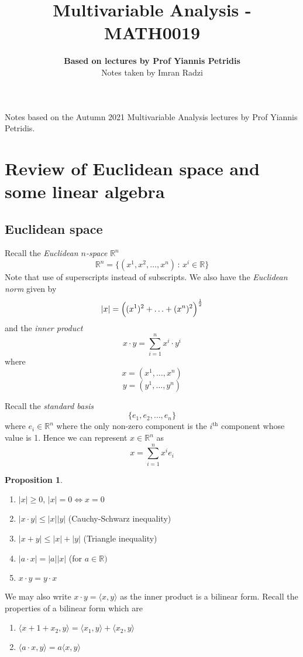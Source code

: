 \documentclass[a4paper,14pt]{extarticle}
\theoremstyle{definition}
\newtheorem*{proposition}{Proposition}
\begin{document}
\title{\textbf{Multivariable Analysis - MATH0019}}
\author{\textbf{Based on lectures by Prof Yiannis Petridis}\\ Notes taken by Imran Radzi}
\date{}
\maketitle

Notes based on the Autumn 2021 Multivariable Analysis lectures by Prof Yiannis Petridis.

\begingroup
\let\cleardoublepage\clearpage
\tableofcontents
\endgroup
\newpage
{}

\section{Review of Euclidean space and some linear algebra}
\subsection{Euclidean space}
Recall the \emph{Euclidean $n$-space} $\mathbb{R}^n$ \[\mathbb{R}^n=\{(x^1,x^2,\ldots,x^n)\,:\,x^i\in\mathbb{R}\}\]
Note that use of superscripts instead of subscripts. We also have the \emph{Euclidean norm} given by \[|x|=\Bigl((x^1)^2+\ldots+(x^n)^2\Bigr)^{\frac{1}{2}}\]
and the \emph{inner product} \[x\cdot y=\sum_{i=1}^n x^i\cdot y^i\] where \[x=(x^1,\ldots,x^n)\] \[y=(y^1,\ldots,y^n)\]

\noindent Recall the \emph{standard basis} \[\{e_1,e_2,\ldots,e_n\}\] where $e_i\in\mathbb{R}^n$ where the only non-zero component is the $i^{\text{th}}$ component whose value is 1.
Hence we can represent $x\in\mathbb{R}^n$ as \[x=\sum_{i=1}^n x^i e_i\]

\begin{proposition} \hfill
	\begin{enumerate}
		\item $|x|\geq0,\,|x|=0\iff x=0$
		\item $|x\cdot y|\leq|x||y|$ \hfill (Cauchy-Schwarz inequality)
		\item $|x+y|\leq|x|+|y|$ \hfill (Triangle inequality)
		\item $|a\cdot x|=|a||x|$ \hfill (for $a\in\mathbb{R})$
		\item $x\cdot y=y\cdot x$
	\end{enumerate}
\end{proposition}

We may also write $x\cdot y=\langle x,y \rangle$ as the inner product is a bilinear form. Recall the properties of a bilinear form which are
\begin{enumerate}
	\item $\langle x+1+x_2,y\rangle=\langle x_1,y\rangle+\langle x_2,y\rangle$
	\item $\langle a\cdot x,y\rangle = a\langle x,y\rangle$
\end{enumerate}
\end{document}
